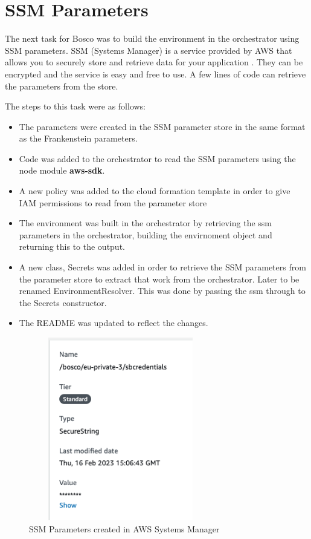 \documentclass[12pt,a4paper,titlepage]{report}
\begin{document}
\section{SSM Parameters}
The next task for Bosco was to build the environment in the orchestrator using SSM parameters. 
SSM (Systems Manager) is a service provided by AWS that allows you to securely store and retrieve data for your application \cite{Halley}.
They can be encrypted and the service is easy and free to use. 
A few lines of code can retrieve the parameters from the store. 

The steps to this task were as follows:
\begin{itemize}
\item The parameters were created in the SSM parameter store in the same format as the Frankenstein parameters.
\item Code was added to the orchestrator to read the SSM parameters using the node module \textbf{aws-sdk}.
\item A new policy was added to the cloud formation template in order to give IAM permissions to read from the parameter store
\item The environment was built in the orchestrator by retrieving the ssm parameters in the orchestrator, building the envirnoment object and returning this to the output.
\item A new class, Secrets was added in order to retrieve the SSM parameters from the parameter store to extract that work from the orchestrator. Later to be renamed EnvironmentResolver. This was done by passing the ssm through to the Secrets constructor.
\item The README was updated to reflect the changes.
\end{itemize}

\begin{figure}[H]
 \centering
 \includegraphics[width=8cm,height=8cm,keepaspectratio]{./diagrams/ssm_params.png}
 \caption{SSM Parameters created in AWS Systems Manager}
\end{figure}
\end{document}
